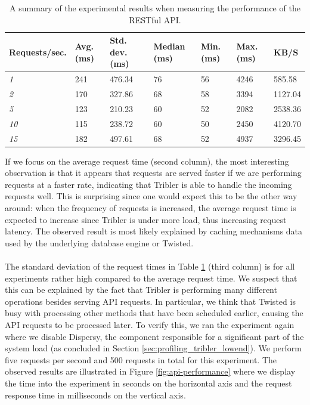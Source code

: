 \begin{table}[]
	\centering
	\begin{tabular}{|l|l|l|l|l|l|l|}
		\hline
		\textbf{Requests/sec.} & \textbf{Avg. (ms)} & \textbf{Std. dev. (ms)} & \textbf{Median (ms)} & \textbf{Min. (ms)} & \textbf{Max. (ms)} & \textbf{KB/S} \\ \hline
		\emph{1} & 241 & 476.34 & 76 & 56 & 4246 & 585.58\\ \hline
		\emph{2} & 170 & 327.86 & 68 & 58 & 3394 & 1127.04\\ \hline
		\emph{5} & 123 & 210.23 & 60 & 52 & 2082 & 2538.36\\ \hline
		\emph{10} & 115 & 238.72 & 60 & 50 & 2450 & 4120.70\\ \hline
		\emph{15} & 182 & 497.61 & 68 & 52 & 4937 & 3296.45\\ \hline
	\end{tabular}
	\caption{A summary of the experimental results when measuring the performance of the RESTful API.}
	\label{table:performance-api-results}
\end{table}

\noindent If we focus on the average request time (second column), the most interesting observation is that it appears that requests are served faster if we are performing requests at a faster rate, indicating that Tribler is able to handle the incoming requests well. This is surprising since one would expect this to be the other way around: when the frequency of requests is increased, the average request time is expected to increase since Tribler is under more load, thus increasing request latency. The observed result is most likely explained by caching mechanisms data used by the underlying database engine or Twisted.\\\\
The standard deviation of the request times in Table \ref{table:performance-api-results} (third column) is for all experiments rather high compared to the average request time. We suspect that this can be explained by the fact that Tribler is performing many different operations besides serving API requests. In particular, we think that Twisted is busy with processing other methods that have been scheduled earlier, causing the API requests to be processed later. To verify this, we ran the experiment again where we disable Dispersy, the component responsible for a significant part of the system load (as concluded in Section \ref{sec:profiling_tribler_lowend}). We perform five requests per second and 500 requests in total for this experiment. The observed results are illustrated in Figure \ref{fig:api-performance} where we display the time into the experiment in seconds on the horizontal axis and the request response time in milliseconds on the vertical axis.\\

